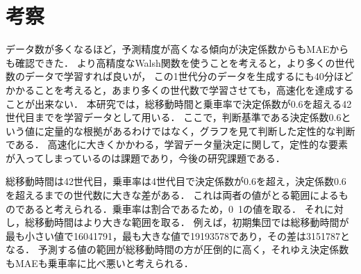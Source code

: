 \documentclass[main]{subfiles}
\begin{document}
    \section{考察}
    データ数が多くなるほど，予測精度が高くなる傾向が決定係数からもMAEからも確認できた．
    より高精度なWalsh関数を使うことを考えると，より多くの世代数のデータで学習すれば良いが，
    この1世代分のデータを生成するにも40分ほどかかることを考えると，あまり多くの世代数で学習させても，高速化を達成することが出来ない．
    本研究では，総移動時間と乗車率で決定係数が0.6を超える42世代目までを学習データとして用いる．
    ここで，判断基準である決定係数0.6という値に定量的な根拠があるわけではなく，グラフを見て判断した定性的な判断である．
    高速化に大きくかかわる，学習データ量決定に関して，定性的な要素が入ってしまっているのは課題であり，今後の研究課題である．
    
    総移動時間は42世代目，乗車率は4世代目で決定係数が0.6を超え，決定係数0.6を超えるまでの世代数に大きな差がある．
    これは両者の値がとる範囲によるものであると考えられる．乗車率は割合であるため，0~1の値を取る．
    それに対し，総移動時間はより大きな範囲を取る．
    例えば，初期集団では総移動時間が最も小さい値で16041791，最も大きな値で19193578であり，その差は3151787となる．
    予測する値の範囲が総移動時間の方が圧倒的に高く，それゆえ決定係数もMAEも乗車率に比べ悪いと考えられる．
\end{document}
